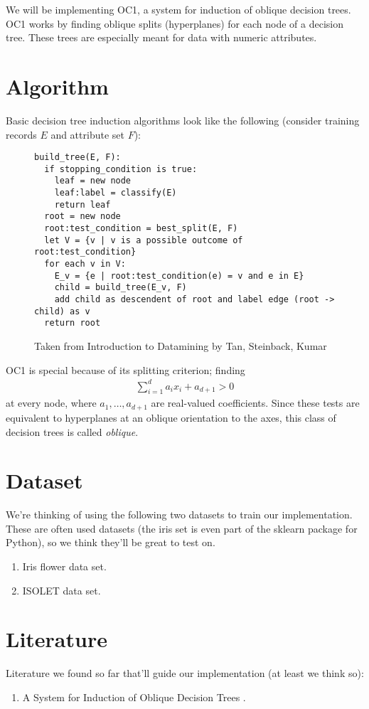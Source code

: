 \documentclass{article}
\begin{document}
We will be implementing OC1, a system for induction of oblique decision trees. OC1 works by finding oblique splits (hyperplanes) for each node of a decision tree. These trees are especially meant for data with numeric attributes.

\section*{Algorithm}
Basic decision tree induction algorithms look like the following (consider training records $E$ and attribute set $F$):
\begin{figure}[h!]
\begin{lstlisting}[frame=single]
build_tree(E, F):
  if stopping_condition is true:
    leaf = new node
    leaf:label = classify(E)
    return leaf
  root = new node
  root:test_condition = best_split(E, F)
  let V = {v | v is a possible outcome of root:test_condition}
  for each v in V:
    E_v = {e | root:test_condition(e) = v and e in E}
    child = build_tree(E_v, F)
    add child as descendent of root and label edge (root -> child) as v
  return root
\end{lstlisting}
\caption{Taken from Introduction to Datamining by Tan, Steinback, Kumar}
\end{figure}

OC1 is special because of its splitting criterion; finding
\begin{align*}
\sum\limits_{i=1}^{d}a_i x_i + a_{d+1} > 0
\end{align*}
at every node, where $a_1, \ldots, a_{d+1}$ are real-valued coefficients. Since these tests are equivalent to hyperplanes at an oblique orientation to the axes, this class of decision trees is called \emph{oblique}.

\section*{Dataset}
We're thinking of using the following two datasets to train our implementation. These are often used datasets (the iris set is even part of the sklearn package for Python), so we think they'll be great to test on.
\begin{enumerate}
\item Iris flower data set\cite{Bache+Lichman:2013}.
\item ISOLET data set\cite{Bache+Lichman:2013}.
\end{enumerate}

\section*{Literature}
Literature we found so far that'll guide our implementation (at least we think so):

\begin{enumerate}
\item A System for Induction of Oblique Decision Trees \cite{KSM:1994}.
\end{enumerate}



\end{document}
